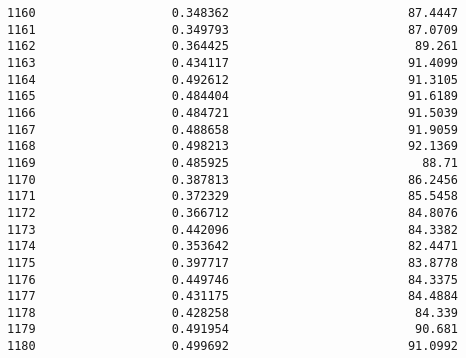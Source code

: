 \documentclass[11pt]{article}
\begin{document}
\begin{tcolorbox}[breakable, size=fbox, boxrule=.5pt, pad at break*=1mm, opacityfill=0]
\begin{Verbatim}[commandchars=\\\{\}]
1160                   0.348362                         87.4447
1161                   0.349793                         87.0709
1162                   0.364425                          89.261
1163                   0.434117                         91.4099
1164                   0.492612                         91.3105
1165                   0.484404                         91.6189
1166                   0.484721                         91.5039
1167                   0.488658                         91.9059
1168                   0.498213                         92.1369
1169                   0.485925                           88.71
1170                   0.387813                         86.2456
1171                   0.372329                         85.5458
1172                   0.366712                         84.8076
1173                   0.442096                         84.3382
1174                   0.353642                         82.4471
1175                   0.397717                         83.8778
1176                   0.449746                         84.3375
1177                   0.431175                         84.4884
1178                   0.428258                          84.339
1179                   0.491954                          90.681
1180                   0.499692                         91.0992


\end{Verbatim}
\end{tcolorbox}
\end{document}
